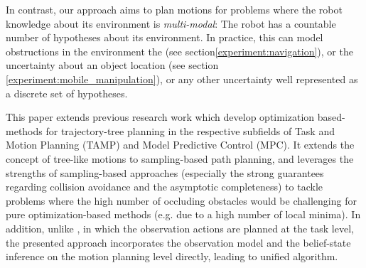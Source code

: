 \documentclass[letterpaper, 10 pt, conference]{ieeeconf}  %
\begin{document}
In contrast, our approach aims to plan motions for problems where the robot knowledge about its environment is \textit{multi-modal}: The robot has a countable number of hypotheses about its environment. In practice, this can model obstructions in the environment the (see section\ref{experiment:navigation}), or the uncertainty about an object location (see section \ref{experiment:mobile_manipulation}), or any other uncertainty well represented as a discrete set of hypotheses.

This paper extends previous research work \cite{tamp-1}\cite{control-tree-1} which develop optimization based-methods for trajectory-tree planning in the respective subfields of Task and Motion Planning (TAMP) and Model Predictive Control (MPC). It extends the concept of tree-like motions to sampling-based path planning, and leverages the strengths of sampling-based approaches (especially the strong guarantees regarding collision avoidance and the asymptotic completeness) to tackle problems where the high number of occluding obstacles would be challenging for pure optimization-based methods (e.g. due to a high number of local minima). %
In addition, unlike \cite{tamp-1}, in which the observation actions are planned at the task level, the presented approach incorporates the observation model and the belief-state inference on the motion planning level directly, leading to unified algorithm.



\end{document}
